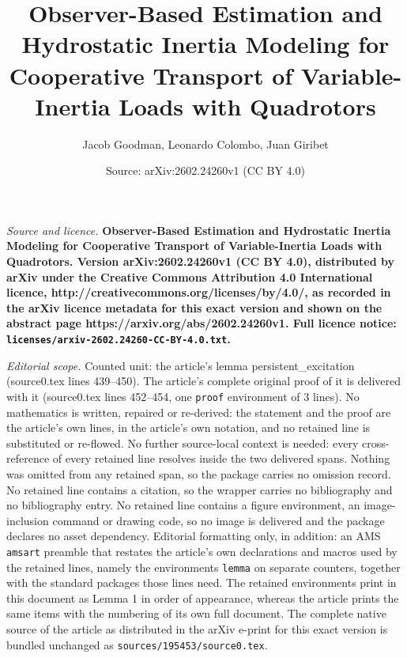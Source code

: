 \documentclass[10pt,a4paper]{amsart}
\title{\LARGE \bf Observer-Based Estimation and Hydrostatic Inertia Modeling for Cooperative Transport of Variable-Inertia Loads with Quadrotors}
\author{Jacob Goodman, Leonardo Colombo, Juan Giribet}
\date{Source: arXiv:2602.24260v1 (CC BY 4.0)}
\begin{document}
\maketitle

\noindent\emph{Source and licence.} \LARGE \bf Observer-Based Estimation and Hydrostatic Inertia Modeling for Cooperative Transport of Variable-Inertia Loads with Quadrotors. Version arXiv:2602.24260v1 (CC BY 4.0), distributed by arXiv under the Creative Commons Attribution 4.0 International licence, http://creativecommons.org/licenses/by/4.0/, as recorded in the arXiv licence metadata for this exact version and shown on the abstract page https://arxiv.org/abs/2602.24260v1. Full licence notice: \texttt{licenses/arxiv-2602.24260-CC-BY-4.0.txt}.\par\smallskip

\noindent\textit{Editorial scope.} Counted unit: the article's lemma persistent\_excitation (source0.tex lines 439--450). The article's complete original proof of it is delivered with it (source0.tex lines 452--454, one \texttt{proof} environment of 3 lines). No mathematics is written, repaired or re-derived: the statement and the proof are the article's own lines, in the article's own notation, and no retained line is substituted or re-flowed.  No further source-local context is needed: every cross-reference of every retained line resolves inside the two delivered spans.  Nothing was omitted from any retained span, so the package carries no omission record.  No retained line contains a citation, so the wrapper carries no bibliography and no bibliography entry.  No retained line contains a figure environment, an image-inclusion command or drawing code, so no image is delivered and the package declares no asset dependency.  Editorial formatting only, in addition: an AMS \texttt{amsart} preamble that restates the article's own declarations and macros used by the retained lines, namely the environments \texttt{lemma} on separate counters, together with the standard packages those lines need.  The retained environments print in this document as Lemma 1 in order of appearance, whereas the article prints the same items with the numbering of its own full document.  The complete native source of the article as distributed in the arXiv e-print for this exact version is bundled unchanged as \texttt{sources/195453/source0.tex}.
\end{document}
